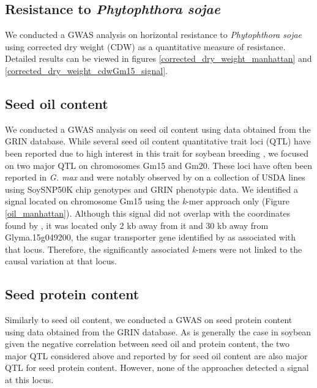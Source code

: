 \subsection*{Resistance to \emph{Phytophthora sojae}}
\label{sv-gwas-resistance}

We conducted a GWAS analysis on horizontal resistance to
\textit{Phytophthora sojae} using corrected dry weight (CDW) as a quantitative
measure of resistance. Detailed results can be viewed in figures
\ref{corrected_dry_weight_manhattan} and
\ref{corrected_dry_weight_cdwGm15_signal}.

\subsection*{Seed oil content}
\label{sv-gwas-seed-oil-content}

We conducted a GWAS analysis on seed oil content using data obtained from the
GRIN database. While several seed oil content quantitative trait loci (QTL)
have been reported due to high interest in this trait for soybean breeding
\citep{chaudhary2015}, we focused on two major QTL on chromosomes Gm15 and Gm20.
These loci have often been reported in \emph{G. max} and were notably observed by
\cite{bandillo2015} on a collection of USDA lines using SoySNP50K chip
genotypes and GRIN phenotypic data. We identified a signal located on
chromosome Gm15 using the \emph{k}-mer approach only (Figure
\ref{oil_manhattan}). Although this signal did not overlap with the coordinates
found by \cite{bandillo2017}, it was located only 2 kb away from it and 30 kb
away from Glyma.15g049200, the sugar transporter gene identified by
\cite{zhang2020} as associated with that locus. Therefore, the significantly
associated \emph{k}-mers were not linked to the causal variation at that locus.

\subsection*{Seed protein content}
\label{sv-gwas-seed-protein-content}

Similarly to seed oil content, we conducted a GWAS on seed protein content
using data obtained from the GRIN database. As is generally the case in
soybean given the negative correlation between seed oil and protein content,
the two major QTL considered above and reported by \cite{bandillo2015} for seed
oil content are also major QTL for seed protein content. However, none of the
approaches detected a signal at this locus.

